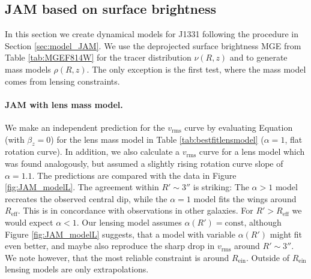 \subsection{JAM based on surface brightness} \label{sec:results_JAM_SB}

In this section we create dynamical models for J1331 following the procedure in Section \ref{sec:model_JAM}. We use the deprojected surface brightness MGE from Table \ref{tab:MGEF814W} for the tracer distribution $\nu(R,z)$ and to generate mass models $\rho(R,z)$. The only exception is the first test, where the mass model comes from lensing constraints.

\paragraph{JAM with lens mass model.} We make an independent prediction for the $v_\text{rms}$ curve by evaluating Equation \Wilma{[TO DO]} (with $\beta_z = 0$) for the lens mass model in Table \ref{tab:bestfitlensmodel} ($\alpha = 1$, flat rotation curve). In addition, we also calculate a  $v_\text{rms}$ curve for a lens model which was found analogously, but assumed a slightly rising rotation curve slope of $\alpha=1.1$. The predictions are compared with the data in Figure \ref{fig:JAM_modelL}. The agreement within $R' \sim 3''$ is striking: The $\alpha > 1$ model recreates the observed central dip, while the $\alpha = 1$ model fits the wings around $R_\text{eff}$. This is in concordance with observations in other galaxies. For $R'> R_\text{eff}$ we would expect $\alpha<1$. Our lensing model assumes $\alpha(R')=\text{const}$, although Figure \ref{fig:JAM_modelL} suggests, that a model with variable $\alpha(R')$ might fit even better, and maybe also reproduce the sharp drop in $v_\text{rms}$ around $R' \sim 3''$. We note however, that the most reliable constraint is around $R_\text{ein}$. Outside of $R_\text{ein}$ lensing models are only extrapolations.


